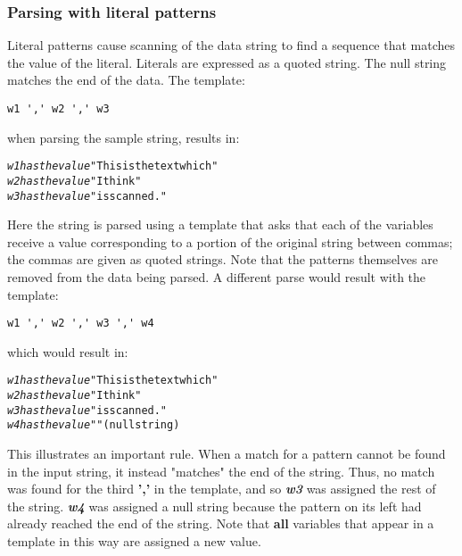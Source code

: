 \subsubsection{Parsing with literal patterns}
\index{,}
\index{,}
 Literal patterns cause scanning of the data string to find a
sequence that matches the value of the literal.  Literals are expressed
as a quoted string.  The null string matches the end of the data.
 The template:
\begin{lstlisting}
w1 ',' w2 ',' w3
\end{lstlisting}
when parsing the sample string, results in:
\begin{alltt}
\emph{w1} \emph{has the value} "This is  the text which"
\emph{w2} \emph{has the value} " I think"
\emph{w3} \emph{has the value} "  is scanned."
\end{alltt}
 Here the string is parsed using a template that asks that each of
the variables receive a value corresponding to a portion of the
original string between commas; the commas are given as quoted strings.
Note that the patterns themselves are removed from the data being
parsed.
 A different parse would result with the template:
\begin{lstlisting}
w1 ',' w2 ',' w3 ',' w4
\end{lstlisting}
which would result in:
\begin{alltt}
\emph{w1} \emph{has the value} "This is  the text which"
\emph{w2} \emph{has the value} " I think"
\emph{w3} \emph{has the value} "  is scanned."
\emph{w4} \emph{has the value} ""  (null string)
\end{alltt}
 This illustrates an important rule.  When a match for a pattern
cannot be found in the input string, it instead "matches" the end
of the string.  Thus, no match was found for the third \textbf{','} in
the template, and so \textbf{\emph{w3}} was assigned the rest of
the string. \textbf{\emph{w4}} was assigned a null string
because the pattern on its left had already reached the end of the
string.
 Note that \textbf{all} variables that appear in a template in this
way are assigned a new value.
